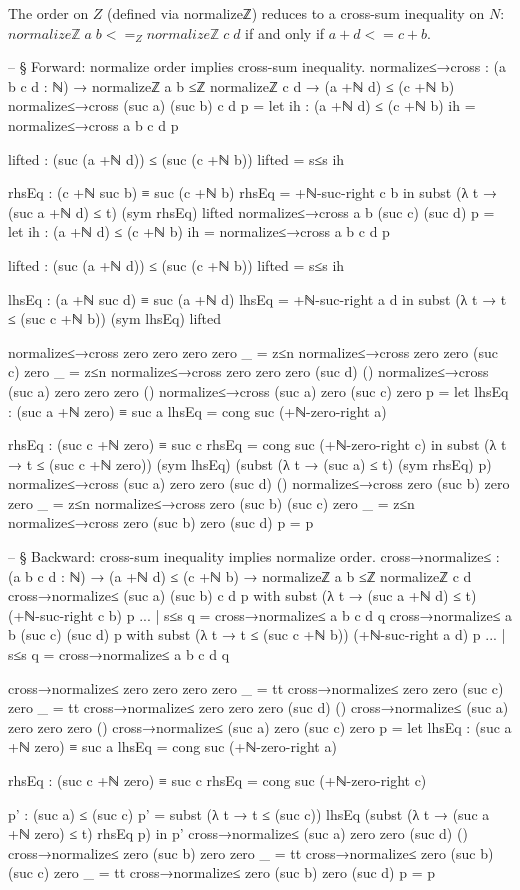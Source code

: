\documentclass[11pt,a4paper]{book}
\def\leq{<=}%
\def\mathbb#1{#1}%
\def\texttt#1{#1}%
\begin{document}
The order on $\mathbb{Z}$ (defined via \texttt{normalizeℤ}) reduces to a cross-sum
inequality on $\mathbb{N}$: $\texttt{normalizeℤ}\;a\;b \leq_{\mathbb{Z}}
\texttt{normalizeℤ}\;c\;d$ if and only if $a + d \leq c + b$.

\begin{code}
-- § Forward: normalize order implies cross-sum inequality.
normalize≤→cross : (a b c d : ℕ) → normalizeℤ a b ≤ℤ normalizeℤ c d → (a +ℕ d) ≤ (c +ℕ b)
normalize≤→cross (suc a) (suc b) c d p =
  let ih : (a +ℕ d) ≤ (c +ℕ b)
      ih = normalize≤→cross a b c d p

      lifted : (suc (a +ℕ d)) ≤ (suc (c +ℕ b))
      lifted = s≤s ih

      rhsEq : (c +ℕ suc b) ≡ suc (c +ℕ b)
      rhsEq = +ℕ-suc-right c b
  in
  subst (λ t → (suc a +ℕ d) ≤ t) (sym rhsEq) lifted
normalize≤→cross a b (suc c) (suc d) p =
  let ih : (a +ℕ d) ≤ (c +ℕ b)
      ih = normalize≤→cross a b c d p

      lifted : (suc (a +ℕ d)) ≤ (suc (c +ℕ b))
      lifted = s≤s ih

      lhsEq : (a +ℕ suc d) ≡ suc (a +ℕ d)
      lhsEq = +ℕ-suc-right a d
  in
  subst (λ t → t ≤ (suc c +ℕ b)) (sym lhsEq) lifted

normalize≤→cross zero zero zero zero _ = z≤n
normalize≤→cross zero zero (suc c) zero _ = z≤n
normalize≤→cross zero zero zero (suc d) ()
normalize≤→cross (suc a) zero zero zero ()
normalize≤→cross (suc a) zero (suc c) zero p =
  let
    lhsEq : (suc a +ℕ zero) ≡ suc a
    lhsEq = cong suc (+ℕ-zero-right a)

    rhsEq : (suc c +ℕ zero) ≡ suc c
    rhsEq = cong suc (+ℕ-zero-right c)
  in
  subst (λ t → t ≤ (suc c +ℕ zero)) (sym lhsEq)
    (subst (λ t → (suc a) ≤ t) (sym rhsEq) p)
normalize≤→cross (suc a) zero zero (suc d) ()
normalize≤→cross zero (suc b) zero zero _ = z≤n
normalize≤→cross zero (suc b) (suc c) zero _ = z≤n
normalize≤→cross zero (suc b) zero (suc d) p = p

-- § Backward: cross-sum inequality implies normalize order.
cross→normalize≤ : (a b c d : ℕ) → (a +ℕ d) ≤ (c +ℕ b) → normalizeℤ a b ≤ℤ normalizeℤ c d
cross→normalize≤ (suc a) (suc b) c d p with subst (λ t → (suc a +ℕ d) ≤ t) (+ℕ-suc-right c b) p
... | s≤s q = cross→normalize≤ a b c d q
cross→normalize≤ a b (suc c) (suc d) p with subst (λ t → t ≤ (suc c +ℕ b)) (+ℕ-suc-right a d) p
... | s≤s q = cross→normalize≤ a b c d q

cross→normalize≤ zero zero zero zero _ = tt
cross→normalize≤ zero zero (suc c) zero _ = tt
cross→normalize≤ zero zero zero (suc d) ()
cross→normalize≤ (suc a) zero zero zero ()
cross→normalize≤ (suc a) zero (suc c) zero p =
  let
    lhsEq : (suc a +ℕ zero) ≡ suc a
    lhsEq = cong suc (+ℕ-zero-right a)

    rhsEq : (suc c +ℕ zero) ≡ suc c
    rhsEq = cong suc (+ℕ-zero-right c)

    p' : (suc a) ≤ (suc c)
    p' =
      subst (λ t → t ≤ (suc c)) lhsEq
        (subst (λ t → (suc a +ℕ zero) ≤ t) rhsEq p)
  in
  p'
cross→normalize≤ (suc a) zero zero (suc d) ()
cross→normalize≤ zero (suc b) zero zero _ = tt
cross→normalize≤ zero (suc b) (suc c) zero _ = tt
cross→normalize≤ zero (suc b) zero (suc d) p = p
\end{code}
\end{document}
